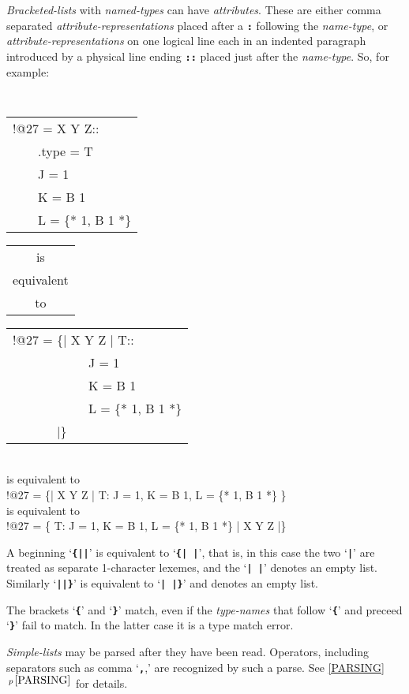 \documentclass[12pt]{article}
\newcommand{\TT}[1]{{\tt \bfseries #1}}
\newcommand{\itemref}[1]{\ref{#1}$\,^{p\,\pageref{#1}}$}
\begin{document}
{\em Bracketed-lists} with {\em named-types} can have {\em attributes}.
These are either comma separated {\em attribute-representations}
placed after a \TT{:} following the {\em name-type}, or
{\em attribute-representations} on one logical line each in an indented
paragraph introduced by a physical line ending \TT{::} placed just
after the {\em name-type}.  So, for example:
\begin{center}
\tt
\begin{tabular}{l}
!@27 = X Y Z:: \\
~~~~.type = T \\
~~~~J = 1 \\
~~~~K = B 1 \\
~~~~L = \{* 1, B 1 *\} \\
\end{tabular}
\begin{tabular}{c}
\rm is \\
\rm equivalent \\
\rm to
\end{tabular}
\begin{tabular}{l}
!@27 = \{| X Y Z | T:: \\
~~~~~~~~~~~~J = 1 \\
~~~~~~~~~~~~K = B 1 \\
~~~~~~~~~~~~L = \{* 1, B 1 *\} \\
~~~~~~~|\} \\
\end{tabular}
\\[1ex]
{\rm is equivalent to}
\\[1ex]
!@27 = \{| X Y Z | T: J = 1, K = B 1, L = \{* 1, B 1 *\} \}
\\[1ex]
{\rm is equivalent to}
\\[1ex]
!@27 = \{ T: J = 1, K = B 1, L = \{* 1, B 1 *\} | X Y Z |\}
\end{center}


A beginning `\TT{\{||}' is equivalent to `\TT{\{|~|}', that is, in this
case the two `\TT{|}' are treated as separate 1-character lexemes, and
the `\TT{|~|}' denotes an empty list.  Similarly `\TT{||\}}' is
equivalent to `\TT{|~|\}}' and denotes an empty list.

The brackets `\TT{\{}' and `\TT{\}}' match, even if the {\em type-names}
that follow `\TT{\{}' and preceed `\TT{\}}' fail to match.
In the latter case it is a type match error.

{\em Simple-lists} may be parsed after they have been read.
Operators, including
separators such as comma `\TT{,},' are recognized by such a parse.  See
\itemref{PARSING} for details.
\end{document}
